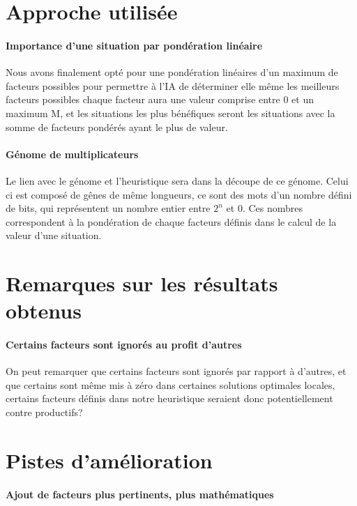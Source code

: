 \documentclass{scrreprt}
\begin{document}
		\section{Approche utilisée}
			\paragraph{Importance d'une situation par pondération linéaire}
			
			Nous avons finalement opté pour une pondération linéaires d'un maximum de facteurs possibles pour permettre à l'IA de déterminer elle même les meilleurs facteurs possibles chaque facteur aura une valeur comprise entre 0 et un maximum M, et les situations les plus bénéfiques seront les situations avec la somme de facteurs pondérés ayant le plus de valeur.  
			
			\paragraph{Génome de multiplicateurs}
			
			Le lien avec le génome et l'heuristique sera dans la découpe de ce génome. Celui ci est composé de gênes de même longueurs, ce sont des mots d'un nombre défini de bits, qui représentent un nombre entier entre $2^{n}$ et $0$. Ces nombres correspondent à la pondération de chaque facteurs définis dans le calcul de la valeur d'une situation.
		
		\section{Remarques sur les résultats obtenus}
			\paragraph{Certains facteurs sont ignorés au profit d'autres}
			
			On peut remarquer que certains facteurs sont ignorés par rapport à d'autres, et que certains sont même mis à zéro dans certaines solutions optimales locales, certains facteurs définis dans notre heuristique seraient donc potentiellement contre productifs?
			
		\section{Pistes d'amélioration}
			\paragraph{Ajout de facteurs plus pertinents, plus mathématiques}
			
\end{document}
